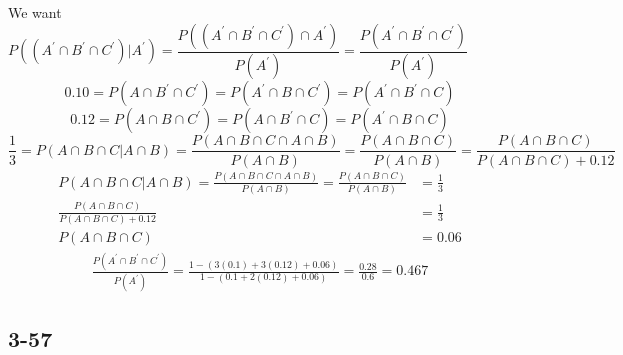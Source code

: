 \documentclass{article}
\begin{document}
		We want $ P((A^\prime \cap B^\prime \cap C^\prime) | A^\prime) = \dfrac{P((A^\prime \cap B^\prime \cap C^\prime) \cap A^\prime)}{P(A^\prime)} = \dfrac{P(A^\prime \cap B^\prime \cap C^\prime)}{P(A^\prime)} $
		\[ 0.10 = P(A \cap B^\prime \cap C^\prime) = P(A^\prime \cap B \cap C^\prime) = P(A^\prime \cap B^\prime \cap C)  \]
		\[ 0.12 = P(A \cap B \cap C^\prime) = P(A \cap B^\prime \cap C) = P(A^\prime \cap B \cap C)  \]
		\[ \frac{1}{3} = P(A \cap B \cap C | A \cap B) = \frac{P(A \cap B \cap C \cap A \cap B)}{P(A \cap B)} = \frac{P(A \cap B \cap C)}{P(A \cap B)} = \frac{P(A \cap B \cap C)}{P(A \cap B \cap C) + 0.12} \]
		\begin{align*}
			P(A \cap B \cap C | A \cap B) = \frac{P(A \cap B \cap C \cap A \cap B)}{P(A \cap B)} = \frac{P(A \cap B \cap C)}{P(A \cap B)} &= \frac{1}{3} \\
			\frac{P(A \cap B \cap C)}{P(A \cap B \cap C) + 0.12} &= \frac{1}{3} \\
			P(A \cap B \cap C) &= 0.06
		\end{align*}
		\begin{align*}
			\frac{P(A^\prime \cap B^\prime \cap C^\prime)}{P(A^\prime)} = \frac{1 - (3(0.1) + 3(0.12) + 0.06)}{1 - (0.1 + 2(0.12) + 0.06)} = \frac{0.28}{0.6} = \boxed{0.467}
		\end{align*}

	\clearpage

		\subsection*{3-57}

			\begin{figure}[!h]
				\centering
				 \par
			\end{figure}
\end{document}
